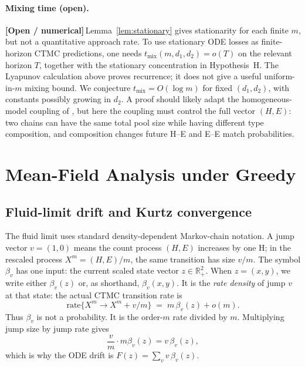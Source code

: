 \documentclass{article}
\theoremstyle{plain}
\theoremstyle{definition}
\newcommand{\open}{\textcolor{openred}{\textbf{[Open / numerical]}}\,}
\begin{document}
\paragraph{Mixing time (open).}
\open Lemma~\ref{lem:stationary} gives stationarity for each finite $m$, but not a quantitative approach rate. To use stationary ODE losses as finite-horizon CTMC predictions, one needs $t_{\mathrm{mix}}(m,d_1,d_2)=o(T)$ on the relevant horizon $T$, together with the stationary concentration in Hypothesis~H. The Lyapunov calculation above proves recurrence; it does not give a useful uniform-in-$m$ mixing bound. We conjecture $t_{\mathrm{mix}}=O(\log m)$ for fixed $(d_1,d_2)$, with constants possibly growing in $d_2$. A proof should likely adapt the homogeneous-model coupling of \cite{akbarpour}, but here the coupling must control the full vector $(H,E)$: two chains can have the same total pool size while having different type composition, and composition changes future H--E and E--E match probabilities.


\section{Mean-Field Analysis under Greedy}
\label{sec:greedy}

\subsection{Fluid-limit drift and Kurtz convergence}\label{ssec:greedy-drift}

The fluid limit uses standard density-dependent Markov-chain notation. A jump vector $v=(1,0)$ means the count process $(H,E)$ increases by one H; in the rescaled process $X^m=(H,E)/m$, the same transition has size $v/m$. The symbol $\beta_v$ has one input: the current scaled state vector $z\in\mathbb R_+^2$. When $z=(x,y)$, we write either $\beta_v(z)$ or, as shorthand, $\beta_v(x,y)$. It is the \emph{rate density} of jump $v$ at that state: the actual CTMC transition rate is
\[
\text{rate}\{X^m\to X^m+v/m\}\;=\;m\,\beta_v(z)+o(m).
\]
Thus $\beta_v$ is not a probability. It is the order-$m$ rate divided by $m$. Multiplying jump size by jump rate gives
\[
\frac{v}{m}\cdot m\beta_v(z)=v\,\beta_v(z),
\]
which is why the ODE drift is $F(z)=\sum_v v\,\beta_v(z)$.
\end{document}
